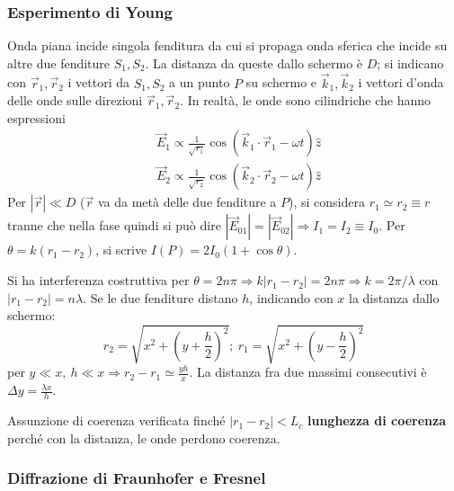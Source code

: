 \documentclass[a4paper]{scrartcl}
\numberwithin{equation}{subsection}
\theoremstyle{style1}
\begin{document}
\subsubsection{Esperimento di Young}

Onda piana incide singola fenditura da cui si propaga onda sferica che incide su altre due fenditure $S_1,S_2$. La distanza da queste dallo schermo \`e $D$; si indicano con $\vec{r}_1, \vec{r}_2$ i vettori da $S_1,S_2$ a un punto $P$ su schermo e $\vec{k}_1, \vec{k}_2$ i vettori d'onda delle onde sulle direzioni $\vec{r}_1, \vec{r}_2$. In realt\`a, le onde sono cilindriche che hanno espressioni 
\[
\begin{split}
	&\vec{E}_1 \propto \frac{1}{\sqrt{r_1} } \cos(\vec{k}_1 \cdot \vec{r}_1 - \omega t) \hat{z}\\
	& \vec{E}_2 \propto \frac{1}{\sqrt{r_2} } \cos(\vec{k}_2 \cdot \vec{r}_2 - \omega t) \hat{z}\end{split}
\] 
Per $\left\lvert \vec{r} \right\rvert \ll D  $ ($\vec{r}$ va da met\`a delle due fenditure a $P$), si considera $r_1\simeq r_2 \equiv r$ tranne che nella fase quindi si pu\`o dire $|\vec{E}_{01} | = |\vec{E}_{02} | \Rightarrow I_1=I_2\equiv I_0$. Per $\theta = k (r_1-r_2)$, si scrive $I(P) = 2 I_0 (1+\cos\theta )$. 

Si ha interferenza costruttiva per $\theta = 2n\pi \Rightarrow k \left\lvert r_1-r_2 \right\rvert = 2n \pi\Rightarrow k =2\pi / \lambda $ con $\left\lvert r_1-r_2 \right\rvert = n \lambda $. Se le due fenditure distano $h$, indicando con $x$ la distanza dallo schermo:
\[
r_2 = \sqrt{ x^2 + \left(y + \frac{h}{2}\right) ^2} ; \ r_1 = \sqrt{x^2 + \left(y - \frac{h}{2}\right) ^2} 
\] 
per $y\ll x,\ h \ll x \Rightarrow r_2-r_1 \simeq \frac{yh }{x}$. La distanza fra due massimi consecutivi \`e $\Delta  y = \frac{\lambda  x}{h}$.

Assunzione di coerenza verificata finch\'e $\left\lvert r_1-r_2 \right\rvert < L_c$ \textbf{lunghezza di coerenza} perch\'e con la distanza, le onde perdono coerenza.
\subsubsection{Diffrazione di Fraunhofer e Fresnel}
\end{document}

